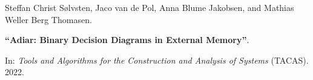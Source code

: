 Steffan Christ Sølvsten, Jaco van de Pol, Anna Blume Jakobsen, and Mathias Weller Berg Thomasen.

{\bf ``Adiar: Binary Decision Diagrams in External Memory''}.

In: \emph{Tools and Algorithms for the Construction and Analysis of Systems} (TACAS).
2022.

\medskip


\label{cite:2022.tacas}
